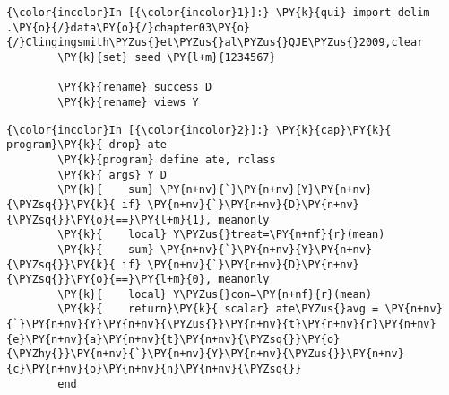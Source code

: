 \documentclass[11pt,notitlepage]{article}\usepackage[]{graphicx}\usepackage[]{color}
\makeatletter
\newenvironment{kframe}{%
 \def\at@end@of@kframe{}%
 \ifinner\ifhmode%
  \def\at@end@of@kframe{\end{minipage}}%
  \begin{minipage}{\columnwidth}%
 \fi\fi%
 \def\FrameCommand##1{\hskip\@totalleftmargin \hskip-\fboxsep
 \colorbox{shadecolor}{##1}\hskip-\fboxsep
     \hskip-\linewidth \hskip-\@totalleftmargin \hskip\columnwidth}%
 \MakeFramed {\advance\hsize-\width
   \@totalleftmargin\z@ \linewidth\hsize
   \@setminipage}}%
 {\par\unskip\endMakeFramed%
 \at@end@of@kframe}
\newenvironment{knitrout}{}{} %
\makeatother
\begin{document}
\begin{knitrout}
\color{fgcolor}\begin{kframe}
    \begin{Verbatim}[commandchars=\\\{\}]
{\color{incolor}In [{\color{incolor}1}]:} \PY{k}{qui} import delim .\PY{o}{/}data\PY{o}{/}chapter03\PY{o}{/}Clingingsmith\PYZus{}et\PYZus{}al\PYZus{}QJE\PYZus{}2009,clear
        \PY{k}{set} seed \PY{l+m}{1234567}
        
        \PY{k}{rename} success D
        \PY{k}{rename} views Y
\end{Verbatim}

    \begin{Verbatim}[commandchars=\\\{\}]
{\color{incolor}In [{\color{incolor}2}]:} \PY{k}{cap}\PY{k}{ program}\PY{k}{ drop} ate
        \PY{k}{program} define ate, rclass
        \PY{k}{	args} Y D
        \PY{k}{    sum} \PY{n+nv}{`}\PY{n+nv}{Y}\PY{n+nv}{\PYZsq{}}\PY{k}{ if} \PY{n+nv}{`}\PY{n+nv}{D}\PY{n+nv}{\PYZsq{}}\PY{o}{==}\PY{l+m}{1}, meanonly
        \PY{k}{    local} Y\PYZus{}treat=\PY{n+nf}{r}(mean)
        \PY{k}{    sum} \PY{n+nv}{`}\PY{n+nv}{Y}\PY{n+nv}{\PYZsq{}}\PY{k}{ if} \PY{n+nv}{`}\PY{n+nv}{D}\PY{n+nv}{\PYZsq{}}\PY{o}{==}\PY{l+m}{0}, meanonly
        \PY{k}{    local} Y\PYZus{}con=\PY{n+nf}{r}(mean)
        \PY{k}{    return}\PY{k}{ scalar} ate\PYZus{}avg = \PY{n+nv}{`}\PY{n+nv}{Y}\PY{n+nv}{\PYZus{}}\PY{n+nv}{t}\PY{n+nv}{r}\PY{n+nv}{e}\PY{n+nv}{a}\PY{n+nv}{t}\PY{n+nv}{\PYZsq{}}\PY{o}{\PYZhy{}}\PY{n+nv}{`}\PY{n+nv}{Y}\PY{n+nv}{\PYZus{}}\PY{n+nv}{c}\PY{n+nv}{o}\PY{n+nv}{n}\PY{n+nv}{\PYZsq{}}
        end
\end{Verbatim}


\end{kframe}
\end{knitrout}
\end{document}
